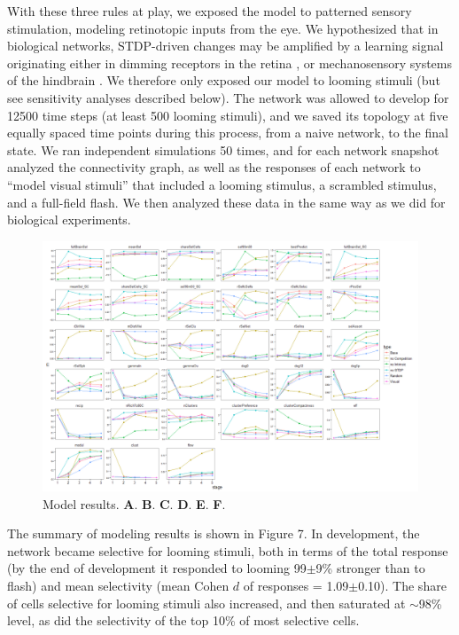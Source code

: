 \documentclass{article}
\begin{document}
With these three rules at play, we exposed the model to patterned sensory stimulation, modeling retinotopic inputs from the eye. We hypothesized that in biological networks, STDP-driven changes may be amplified by a learning signal \citep{savin2014stdpreward,aswolinskiy2015stdpreward} originating either in dimming receptors in the retina \citep{baranauskas2012}, or mechanosensory systems of the hindbrain \citep{pratt2009multisens,felch2016,truszkowski2017}. We therefore only exposed our model to looming stimuli (but see sensitivity analyses described below). The network was allowed to develop for 12500 time steps (at least 500 looming stimuli), and we saved its topology at five equally spaced time points during this process, from a naive network, to the final state. We ran independent simulations 50 times, and for each network snapshot analyzed the connectivity graph, as well as the responses of each network to “model visual stimuli” that included a looming stimulus, a scrambled stimulus, and a full-field flash. We then analyzed these data in the same way as we did for biological experiments.

\begin{figure}[t!]
\includegraphics[width=\linewidth]{fig7.png}
\caption{
Model results. \textbf{A}. \textbf{B}. \textbf{C}. \textbf{D}. \textbf{E}. \textbf{F}. }
\end{figure}

The summary of modeling results is shown in Figure 7. In development, the network became selective for looming stimuli, both in terms of the total response (by the end of development it responded to looming 99$\pm$9\% stronger than to flash) and mean selectivity (mean Cohen $d$ of responses = 1.09$\pm$0.10). The share of cells selective for looming stimuli also increased, and then saturated at $\sim$98\% level, as did the selectivity of the top 10\% of most selective cells.
\end{document}
